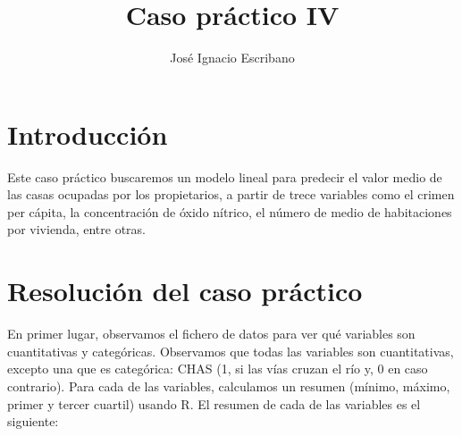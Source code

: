 \documentclass[12pt,a4paper,twoside,openright,titlepage,final]{article}
\author{José Ignacio Escribano}
\title{Caso práctico IV}
\begin{document}
\setcounter{page}{1}


\listoffigures
\thispagestyle{empty}
\newpage

\tableofcontents
\thispagestyle{empty}
\newpage


\setcounter{page}{1}

\section{Introducción}

Este caso práctico buscaremos un modelo lineal para predecir el valor medio de las casas ocupadas por los propietarios, a partir de trece variables como el crimen per cápita, la concentración de óxido nítrico, el número de medio de habitaciones por vivienda, entre otras. 

\section{Resolución del caso práctico}

En primer lugar, observamos el fichero de datos para ver qué variables son cuantitativas y categóricas. Observamos que todas las variables son cuantitativas, excepto una que es categórica: CHAS (1, si las vías cruzan el río y, 0 en caso contrario). Para cada de las variables, calculamos un resumen (mínimo, máximo, primer y tercer cuartil) usando R. El resumen de cada de las variables es el siguiente:
\end{document}

